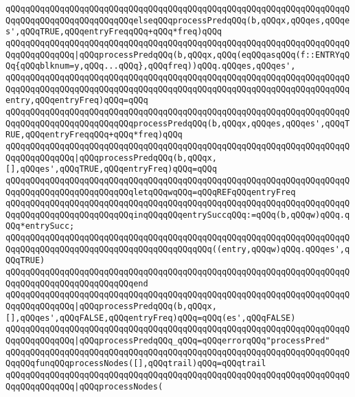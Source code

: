 \verb|qQQqqQQqqQQqqQQqqQQqqQQqqQQqqQQqqQQqqQQqqQQqqQQqqQQqqQQqqQQqqQQqqQQqqQQqqQQqqQQqqQQqqQQqqQQqqQQqelseqQQqprocessPredqQQq(b,qQQqx,qQQqes,qQQqes',qQQqTRUE,qQQqentryFreqqQQq+qQQq*freq)qQQq|\newline
\verb|qQQqqQQqqQQqqQQqqQQqqQQqqQQqqQQqqQQqqQQqqQQqqQQqqQQqqQQqqQQqqQQqqQQqqQQqqQQqqQQqqQQq|\verb#|qQQqprocessPredqQQq(b,qQQqx,qQQq(eqQQqasqQQq(f::ENTRYqQQq{qQQqblknum=y,qQQq...qQQq},qQQqfreq))qQQq.qQQqes,qQQqes',#\newline
\verb|qQQqqQQqqQQqqQQqqQQqqQQqqQQqqQQqqQQqqQQqqQQqqQQqqQQqqQQqqQQqqQQqqQQqqQQqqQQqqQQqqQQqqQQqqQQqqQQqqQQqqQQqqQQqqQQqqQQqqQQqqQQqqQQqqQQqqQQqqQQqentry,qQQqentryFreq)qQQq=qQQq|\newline
\verb|qQQqqQQqqQQqqQQqqQQqqQQqqQQqqQQqqQQqqQQqqQQqqQQqqQQqqQQqqQQqqQQqqQQqqQQqqQQqqQQqqQQqqQQqqQQqqQQqprocessPredqQQq(b,qQQqx,qQQqes,qQQqes',qQQqTRUE,qQQqentryFreqqQQq+qQQq*freq)qQQq|\newline
\verb|qQQqqQQqqQQqqQQqqQQqqQQqqQQqqQQqqQQqqQQqqQQqqQQqqQQqqQQqqQQqqQQqqQQqqQQqqQQqqQQqqQQq|\verb#|qQQqprocessPredqQQq(b,qQQqx,[],qQQqes',qQQqTRUE,qQQqentryFreq)qQQq=qQQq#\newline
\verb|qQQqqQQqqQQqqQQqqQQqqQQqqQQqqQQqqQQqqQQqqQQqqQQqqQQqqQQqqQQqqQQqqQQqqQQqqQQqqQQqqQQqqQQqqQQqqQQqletqQQqwqQQq=qQQqREFqQQqentryFreq|\newline
\verb|qQQqqQQqqQQqqQQqqQQqqQQqqQQqqQQqqQQqqQQqqQQqqQQqqQQqqQQqqQQqqQQqqQQqqQQqqQQqqQQqqQQqqQQqqQQqqQQqinqQQqqQQqentrySuccqQQq:=qQQq(b,qQQqw)qQQq.qQQq*entrySucc;|\newline
\verb|qQQqqQQqqQQqqQQqqQQqqQQqqQQqqQQqqQQqqQQqqQQqqQQqqQQqqQQqqQQqqQQqqQQqqQQqqQQqqQQqqQQqqQQqqQQqqQQqqQQqqQQqqQQqqQQq((entry,qQQqw)qQQq.qQQqes',qQQqTRUE)|\newline
\verb|qQQqqQQqqQQqqQQqqQQqqQQqqQQqqQQqqQQqqQQqqQQqqQQqqQQqqQQqqQQqqQQqqQQqqQQqqQQqqQQqqQQqqQQqqQQqqQQqend|\newline
\verb|qQQqqQQqqQQqqQQqqQQqqQQqqQQqqQQqqQQqqQQqqQQqqQQqqQQqqQQqqQQqqQQqqQQqqQQqqQQqqQQqqQQq|\verb#|qQQqprocessPredqQQq(b,qQQqx,[],qQQqes',qQQqFALSE,qQQqentryFreq)qQQq=qQQq(es',qQQqFALSE)#\newline
\verb|qQQqqQQqqQQqqQQqqQQqqQQqqQQqqQQqqQQqqQQqqQQqqQQqqQQqqQQqqQQqqQQqqQQqqQQqqQQqqQQqqQQq|\verb#|qQQqprocessPredqQQq_qQQq=qQQqerrorqQQq"processPred"#\newline
\newline
\verb|qQQqqQQqqQQqqQQqqQQqqQQqqQQqqQQqqQQqqQQqqQQqqQQqqQQqqQQqqQQqqQQqqQQqqQQqqQQqfunqQQqprocessNodes([],qQQqtrail)qQQq=qQQqtrail|\newline
\verb|qQQqqQQqqQQqqQQqqQQqqQQqqQQqqQQqqQQqqQQqqQQqqQQqqQQqqQQqqQQqqQQqqQQqqQQqqQQqqQQqqQQq|\verb#|qQQqprocessNodes(#\newline
